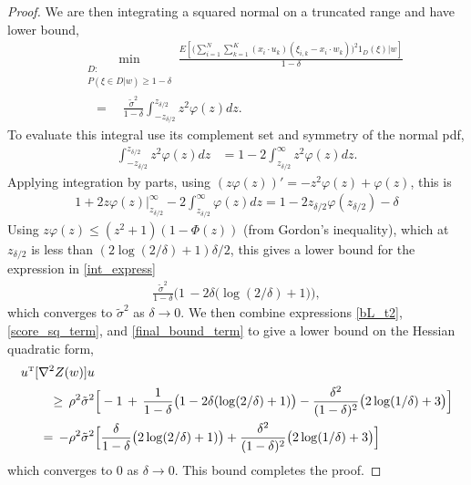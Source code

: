 \documentclass{article}
\numberwithin{equation}{section}
\theoremstyle{Lemma}
\theoremstyle{Corollary}
\theoremstyle{Theorem}
\theoremstyle{Remark}
\begin{document}
\begin{proof}
We are then integrating a squared normal on a truncated range and have lower bound,
\begin{align}
    &\min_{\substack{D:\\P(\xi \in D|w) \geq 1-\delta} } \frac{E[\Big(\sum_{i=1}^{N}\sum_{k=1}^{K}(x_{i}\cdot u_{k})(\xi_{i,k}-x_{i}\cdot w_{k})\Big)^{2}1_{D}(\xi)|w]}{1-\delta}\\
    &\quad =\quad \frac{\tilde{\sigma}^{2}}{1-\delta} \int_{-z_{\delta/2}}^{z_{\delta/2}}z^{2}\varphi(z)dz.\label{int_express}
\end{align}
To evaluate this integral use its complement set and symmetry of the normal pdf,
\begin{align}
   \int_{-z_{\delta/2}}^{z_{\delta/2}} z^2 \varphi(z)dz&=1-2\int_{z_{\delta/2}}^{\infty} z^2 \varphi(z)dz.
\end{align}
Applying integration by parts, using $(z\varphi(z))'= -z^2 \varphi(z)+ \varphi(z)$, this is
\begin{align}
    1+ 2 z\varphi(z)|_{z_{\delta/2}}^{\infty} -2\int_{z_{\delta/2}}^\infty \varphi(z)dz = 1-2z_{\delta/2}\varphi(z_{\delta/2}) -\delta
\end{align}
Using $z\varphi(z) \le (z^2+1)(1-\Phi(z))$ (from Gordon's inequality), which at $z_{\delta/2}$ is less than $(2\log(2/\delta)+1)\delta/2$, this gives a lower bound for the expression in \eqref{int_express}
\begin{align}
    \frac{\tilde{\sigma}^2}{1-\delta}\Big(1\,-2\delta\big(\log(2/\delta)+1\big)\Big)\label{final_bound_term},
\end{align}
which converges to $\tilde{\sigma}^2$ as $\delta \to 0$. 
We then combine expressions \eqref{bL_t2}, \eqref{score_sq_term}, and \eqref{final_bound_term} to give a lower bound on the Hessian quadratic form,
\begin{align}
     u^{\text{\tiny{T}}}[\nabla^{2} Z(w)]u&\\
\geq\,
\rho^{2}\tilde{\sigma}^{2}&\Big[-1\,+\,\frac{1}{1-\delta}\big(1- 2\delta(\log(2/\delta)+1)\big)-\frac{\delta^2}{(1-\delta)^2}\big(2\log(1/\delta)+3\big)\Big]\\
= \,
-\rho^{2}\tilde{\sigma}^{2}&\Big[\frac{\delta}{1-\delta}\big(2\log(2/\delta)+1)\big)+\frac{\delta^2}{(1-\delta)^2}\big(2\log(1/\delta)+3\big)\Big]
\end{align}
which converges to 0 as $\delta \to 0$.  This bound completes the proof.


\end{proof}
\end{document}
